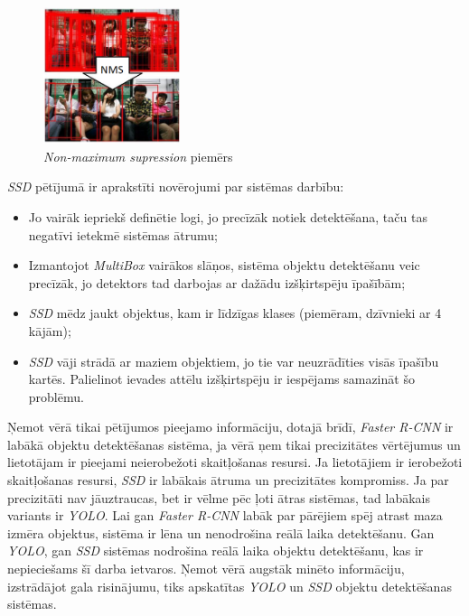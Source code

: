 \begin{figure}[h]%
	\centering
	\includegraphics[height=4cm]{images/nms.png} %
	\caption{\textit{Non-maximum supression} piemērs \cite{liu2016ssd}}%
	\label{fig:example}%
\end{figure}

\textit{SSD} pētījumā \cite{liu2016ssd} ir aprakstīti novērojumi par sistēmas darbību:
\begin{itemize}
	\item Jo vairāk iepriekš definētie logi, jo precīzāk notiek detektēšana, taču tas negatīvi ietekmē sistēmas ātrumu;
	\item Izmantojot \textit{MultiBox} vairākos slāņos, sistēma objektu detektēšanu veic precīzāk, jo detektors tad darbojas ar dažādu izšķirtspēju īpašībām;
	\item \textit{SSD} mēdz jaukt objektus, kam ir līdzīgas klases (piemēram, dzīvnieki ar 4 kājām);
	\item \textit{SSD} vāji strādā ar maziem objektiem, jo tie var neuzrādīties visās īpašību kartēs. Palielinot ievades attēlu izšķirtspēju ir iespējams samazināt šo problēmu.
\end{itemize}

Ņemot vērā tikai pētījumos \cite{redmon2016you,ren2015faster,liu2016ssd} pieejamo informāciju, dotajā brīdī, \textit{Faster R-CNN} ir labākā objektu detektēšanas sistēma, ja vērā ņem tikai precizitātes vērtējumus un lietotājam ir pieejami neierobežoti skaitļošanas resursi. Ja lietotājiem ir ierobežoti skaitļošanas resursi, \textit{SSD} ir labākais ātruma un precizitātes kompromiss. Ja par precizitāti nav jāuztraucas, bet ir vēlme pēc ļoti ātras sistēmas, tad labākais variants ir \textit{YOLO}. Lai gan \textit{Faster R-CNN} labāk par pārējiem spēj atrast maza izmēra objektus, sistēma ir lēna un nenodrošina reālā laika detektēšanu. Gan \textit{YOLO}, gan \textit{SSD} sistēmas nodrošina reālā laika objektu detektēšanu, kas ir nepieciešams šī darba ietvaros. Ņemot vērā augstāk minēto informāciju, izstrādājot gala risinājumu, tiks apskatītas \textit{YOLO} un \textit{SSD} objektu detektēšanas sistēmas. 

